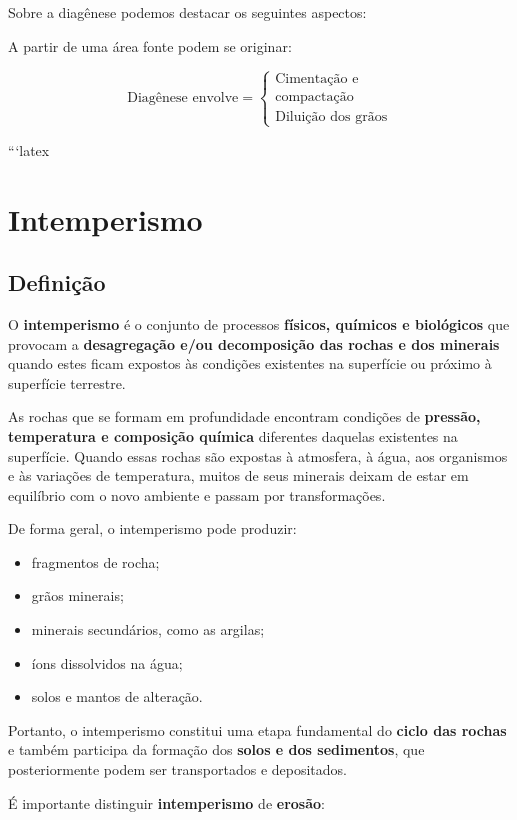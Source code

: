 \documentclass[a4paper,12pt]{article}
\theoremstyle{definition}
\theoremstyle{definition}
\theoremstyle{definition}
\begin{document}
Sobre a diagênese podemos destacar os seguintes aspectos:

A partir de uma área fonte podem se originar:

\[
\text{Diagênese envolve} =
\left\{
\begin{array}{l}
\text{Cimentação e} \\
\text{compactação} \\
\text{Diluição dos grãos}
\end{array}
\right.
\]

```latex
\section{Intemperismo}

\subsection{Definição}

O \textbf{intemperismo} é o conjunto de processos \textbf{físicos, químicos e biológicos} que provocam a \textbf{desagregação e/ou decomposição das rochas e dos minerais} quando estes ficam expostos às condições existentes na superfície ou próximo à superfície terrestre.

As rochas que se formam em profundidade encontram condições de \textbf{pressão, temperatura e composição química} diferentes daquelas existentes na superfície. Quando essas rochas são expostas à atmosfera, à água, aos organismos e às variações de temperatura, muitos de seus minerais deixam de estar em equilíbrio com o novo ambiente e passam por transformações.

De forma geral, o intemperismo pode produzir:

\begin{itemize}
    \item fragmentos de rocha;
    \item grãos minerais;
    \item minerais secundários, como as argilas;
    \item íons dissolvidos na água;
    \item solos e mantos de alteração.
\end{itemize}

Portanto, o intemperismo constitui uma etapa fundamental do \textbf{ciclo das rochas} e também participa da formação dos \textbf{solos e dos sedimentos}, que posteriormente podem ser transportados e depositados.

É importante distinguir \textbf{intemperismo} de \textbf{erosão}:
\end{document}
